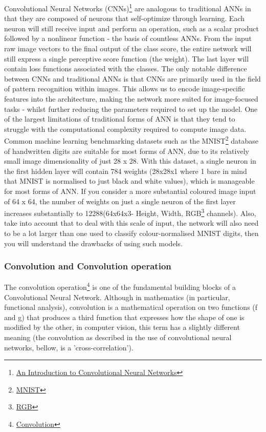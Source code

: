 Convolutional Neural Networks (CNNs)\footnote{\href{https://arxiv.org/pdf/1511.08458.pdf}{An Introduction to Convolutional Neural Networks}} are analogous to traditional ANNs in that they are composed of neurons that self-optimize through learning. Each neuron will still receive input and perform an operation, such as a scalar product followed by a nonlinear function - the basis of countless ANNs. From the input raw image vectors to the final output of the class score, the entire network will still express a single perceptive score function (the weight). The last layer will contain loss functions associated with the classes.
The only notable difference between CNNs and traditional ANNs is that CNNs are primarily used in the field of pattern recognition within images. This allows us to encode image-specific features into the architecture, making the network more suited for image-focused tasks - whilst further reducing the parameters required to set up the model. 
One of the largest limitations of traditional forms of ANN is that they tend to struggle with the computational complexity required to compute image data. Common machine learning benchmarking datasets such as the MNIST\footnote{\href{http://yann.lecun.com/exdb/mnist/}{MNIST}} database of handwritten digits are suitable for most forms of ANN, due to its relatively small image dimensionality of just 28 x 28. With this dataset, a single neuron in the first hidden layer will contain 784 weights (28x28x1 where 1 bare in mind that MNIST is normalised to just black and white values), which is manageable for most forms of ANN. If you consider a more substantial coloured image input of 64 x 64, the number of weights on just a single neuron of the first layer increases substantially to 12288(64x64x3- Height, Width, RGB\footnote{\href{https://en.wikipedia.org/wiki/RGB_color_model}{RGB}}
 channels). Also, take into account that to deal with this scale of input, the network will also need to be a lot larger than one used to classify colour-normalised MNIST digits, then you will understand the drawbacks of using such models.
 
\subsubsection{Convolution and Convolution operation}
The convolution operation\footnote{\href{https://en.wikipedia.org/wiki/Convolution}{Convolution}} is one of the fundamental building blocks of a Convolutional Neural Network.
Although in mathematics (in particular, functional analysis), convolution is a mathematical operation on two functions (f and g) that produces a third function that expresses how the shape of one is modified by the other, in computer vision, this term has a slightly different meaning (the convolution as described in the use of convolutional neural networks, bellow, is a 'cross-correlation').

